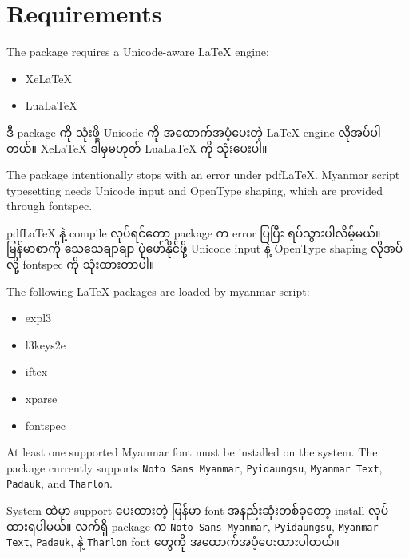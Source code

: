 \documentclass[a4paper,11pt]{article}
\newcommand{\pkg}[1]{\textsf{#1}}
\newenvironment{burmese}
  {\par\smallskip\begin{myanmar}\sloppy}
  {\par\end{myanmar}\fussy\smallskip}
\begin{document}
\section{Requirements}

The package requires a Unicode-aware LaTeX engine:

\begin{itemize}
  \item XeLaTeX
  \item LuaLaTeX
\end{itemize}

\begin{burmese}
ဒီ package ကို သုံးဖို့ Unicode ကို အထောက်အပံ့ပေးတဲ့ LaTeX engine လိုအပ်ပါတယ်။ 
XeLaTeX ဒါမှမဟုတ် LuaLaTeX ကို သုံးပေးပါ။
\end{burmese}

The package intentionally stops with an error under pdfLaTeX. Myanmar script
typesetting needs Unicode input and OpenType shaping, which are provided through
\pkg{fontspec}.

\begin{burmese}
pdfLaTeX နဲ့ compile လုပ်ရင်တော့ package က error ပြပြီး ရပ်သွားပါလိမ့်မယ်။ 
မြန်မာစာကို သေသေချာချာ ပုံဖော်နိုင်ဖို့ Unicode input နဲ့ OpenType shaping 
လိုအပ်လို့ \pkg{fontspec} ကို သုံးထားတာပါ။
\end{burmese}

The following LaTeX packages are loaded by \pkg{myanmar-script}:

\begin{itemize}
  \item \pkg{expl3}
  \item \pkg{l3keys2e}
  \item \pkg{iftex}
  \item \pkg{xparse}
  \item \pkg{fontspec}
\end{itemize}

At least one supported Myanmar font must be installed on the system. The
package currently supports \texttt{Noto Sans Myanmar}, \texttt{Pyidaungsu},
\texttt{Myanmar Text}, \texttt{Padauk}, and \texttt{Tharlon}.

\begin{burmese}
System ထဲမှာ support ပေးထားတဲ့ မြန်မာ font အနည်းဆုံးတစ်ခုတော့ install လုပ်ထားရပါမယ်။ 
လက်ရှိ package က \texttt{Noto Sans Myanmar}, \texttt{Pyidaungsu}, 
\texttt{Myanmar Text}, \texttt{Padauk}, နဲ့ \texttt{Tharlon} font တွေကို 
အထောက်အပံ့ပေးထားပါတယ်။
\end{burmese}
\end{document}
